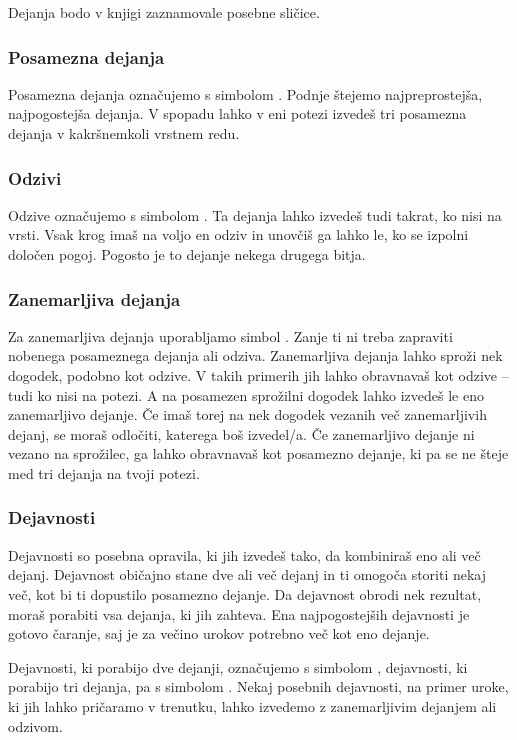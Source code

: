 Dejanja bodo v knjigi zaznamovale posebne sličice.

\subsubsection{\oneaction Posamezna dejanja}
Posamezna dejanja označujemo s simbolom \oneaction. Podnje štejemo najpreprostejša, najpogostejša dejanja. V spopadu lahko v eni potezi izvedeš tri posamezna dejanja v kakršnemkoli vrstnem redu.

\subsubsection{\reaction Odzivi}
Odzive označujemo s simbolom \reaction. Ta dejanja lahko izvedeš tudi takrat, ko nisi na vrsti. Vsak krog imaš na voljo en odziv in unovčiš ga lahko le, ko se izpolni določen pogoj. Pogosto je to dejanje nekega drugega bitja.

\subsubsection{\freeaction Zanemarljiva dejanja}
Za zanemarljiva dejanja uporabljamo simbol \freeaction. Zanje ti ni treba zapraviti nobenega posameznega dejanja ali odziva. Zanemarljiva dejanja lahko sproži nek dogodek, podobno kot odzive. V takih primerih jih lahko obravnavaš kot odzive -- tudi ko nisi na potezi. A na posamezen sprožilni dogodek lahko izvedeš le eno zanemarljivo dejanje. Če imaš torej na nek dogodek vezanih več zanemarljivih dejanj, se moraš odločiti, katerega boš izvedel/a. Če zanemarljivo dejanje ni vezano na sprožilec, ga lahko obravnavaš kot posamezno dejanje, ki pa se ne šteje med tri dejanja na tvoji potezi.

\subsubsection{Dejavnosti}
Dejavnosti so posebna opravila, ki jih izvedeš tako, da kombiniraš eno ali več dejanj. Dejavnost običajno stane dve ali več dejanj in ti omogoča storiti nekaj več, kot bi ti dopustilo posamezno dejanje. Da dejavnost obrodi nek rezultat, moraš porabiti vsa dejanja, ki jih zahteva. Ena najpogostejših dejavnosti je gotovo čaranje, saj je za večino urokov potrebno več kot eno dejanje.

Dejavnosti, ki porabijo dve dejanji, označujemo s simbolom \twoactions, dejavnosti, ki porabijo tri dejanja, pa s simbolom \threeactions. Nekaj posebnih dejavnosti, na primer uroke, ki jih lahko pričaramo v trenutku, lahko izvedemo z zanemarljivim dejanjem ali odzivom.

